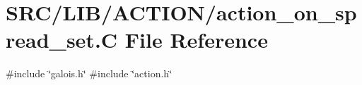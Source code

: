 \hypertarget{action__on__spread__set_8_c}{}\section{S\+R\+C/\+L\+I\+B/\+A\+C\+T\+I\+O\+N/action\+\_\+on\+\_\+spread\+\_\+set.C File Reference}
\label{action__on__spread__set_8_c}
{\ttfamily \#include \char`\"{}galois.\+h\char`\"{}}\newline
{\ttfamily \#include \char`\"{}action.\+h\char`\"{}}\newline
